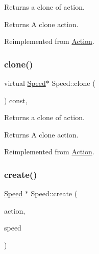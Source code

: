 Returns a clone of action.

\begin{DoxyReturn}{Returns}
A clone action. 
\end{DoxyReturn}


Reimplemented from \hyperlink{classAction_a6a047ad6b3bd200b0f86c7bb519b31ea}{Action}.

\mbox{\label{classSpeed_a3d2902e3bce456bd031a8692bbe22d4d}} 
\subsubsection{\texorpdfstring{clone()}{clone()}\hspace{0.1cm}{\footnotesize\ttfamily [2/2]}}
{\footnotesize\ttfamily virtual \hyperlink{classSpeed}{Speed}$\ast$ Speed\+::clone (\begin{DoxyParamCaption}\item[{void}]{ }\end{DoxyParamCaption}) const\hspace{0.3cm}{\ttfamily [override]}, {\ttfamily [virtual]}}

Returns a clone of action.

\begin{DoxyReturn}{Returns}
A clone action. 
\end{DoxyReturn}


Reimplemented from \hyperlink{classAction_a6a047ad6b3bd200b0f86c7bb519b31ea}{Action}.

\mbox{\label{classSpeed_ada56fcb628e1b9c8a40b2a8242351534}} 
\subsubsection{\texorpdfstring{create()}{create()}\hspace{0.1cm}{\footnotesize\ttfamily [1/2]}}
{\footnotesize\ttfamily \hyperlink{classSpeed}{Speed} $\ast$ Speed\+::create (\begin{DoxyParamCaption}\item[{\hyperlink{classActionInterval}{Action\+Interval} $\ast$}]{action,  }\item[{float}]{speed }\end{DoxyParamCaption})\hspace{0.3cm}{\ttfamily [static]}}

